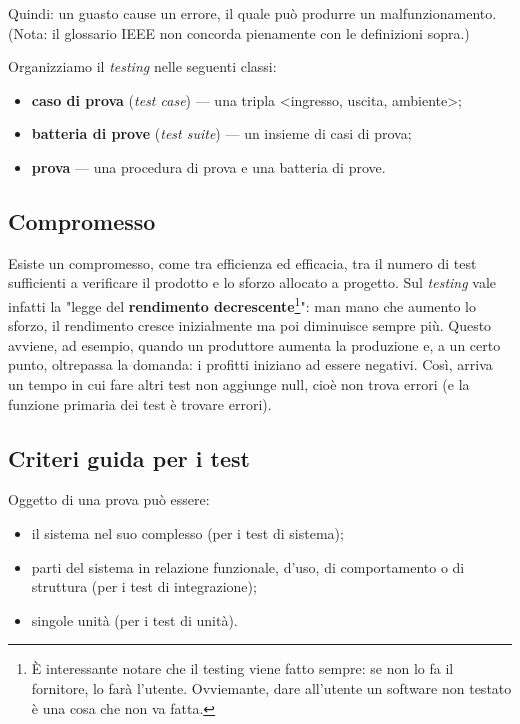 \documentclass[a4paper]{article}
\begin{document}
		
Quindi: un guasto cause un errore, il quale può produrre un malfunzionamento. (Nota: il glossario IEEE non concorda pienamente con le definizioni sopra.)
		
Organizziamo il \emph{testing} nelle seguenti classi:
		
	\begin{itemize}
		
			
	\item \textbf{caso di prova} (\emph{test case}) --- una tripla \textless{}ingresso, uscita, ambiente\textgreater{};
			
	\item \textbf{batteria di prove} (\emph{test suite}) --- un insieme di casi di prova;
			
	\item \textbf{prova} --- una procedura di prova e una batteria di prove.
		
	\end{itemize}


		
	\subsection{Compromesso}

		
Esiste un compromesso, come tra efficienza ed efficacia, tra il numero di test sufficienti a verificare il prodotto e lo sforzo allocato a progetto. Sul \emph{testing} vale infatti la "legge del \textbf{rendimento decrescente}\footnote{È interessante notare che il testing viene fatto sempre: se non lo fa il fornitore, lo farà l'utente. Ovviemante, dare all'utente un software non testato è una cosa che non va fatta.}": man mano che aumento lo sforzo, il rendimento cresce inizialmente ma poi diminuisce sempre più. Questo avviene, ad esempio, quando un produttore aumenta la produzione e, a un certo punto, oltrepassa la domanda: i profitti iniziano ad essere negativi. Così, arriva un tempo in cui fare altri test non aggiunge null, cioè non trova errori (e la funzione primaria dei test è trovare errori).

		
	\subsection{Criteri guida per i test}

		
Oggetto di una prova può essere:
		
	\begin{itemize}
		
			
	\item il sistema nel suo complesso (per i test di sistema);
			
	\item parti del sistema in relazione funzionale, d'uso, di comportamento o di struttura (per i test di integrazione);
			
	\item singole unità (per i test di unità).
		
	\end{itemize}
\end{document}
